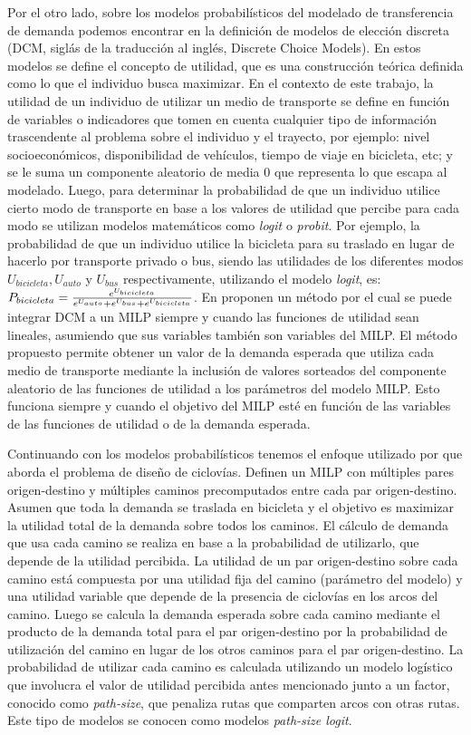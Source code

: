   Por el otro lado, sobre los modelos probabilísticos del modelado de transferencia de demanda podemos encontrar en \textcite{ortuz2011} la definición de modelos de elección discreta (DCM, siglás de la traducción al inglés, Discrete Choice Models). En estos modelos se define el concepto de utilidad, que es una construcción teórica definida como lo que el individuo busca maximizar. En el contexto de este trabajo, la utilidad de un individuo de utilizar un medio de transporte se define en función de variables o indicadores que tomen en cuenta cualquier tipo de información trascendente al problema sobre el individuo y el trayecto, por ejemplo: nivel socioeconómicos, disponibilidad de vehículos, tiempo de viaje en bicicleta, etc; y se le suma un componente aleatorio de media 0 que representa lo que escapa al modelado. Luego, para determinar la probabilidad de que un individuo utilice cierto modo de transporte en base a los valores de utilidad que percibe para cada modo se utilizan modelos matemáticos como {\it logit} o {\it probit}. Por ejemplo, la probabilidad de que un individuo utilice la bicicleta para su traslado en lugar de hacerlo por transporte privado o bus, siendo las utilidades de los diferentes modos $U_{bicicleta}, U_{auto}$ y $U_{bus}$ respectivamente, utilizando el modelo {\it logit}, es: $P_{bicicleta} = {e^{U_{bicicleta}} \over {e^{U_{auto}} + e^{U_{bus}} + e^{U_{bicicleta}}}}$. En \textcite{Pacheco2021} proponen un método por el cual se puede integrar DCM a un MILP siempre y cuando las funciones de utilidad sean lineales, asumiendo que sus variables también son variables del MILP. El método propuesto permite obtener un valor de la demanda esperada que utiliza cada medio de transporte mediante la inclusión de valores sorteados del componente aleatorio de las funciones de utilidad a los parámetros del modelo MILP. Esto funciona siempre y cuando el objetivo del MILP esté en función de las variables de las funciones de utilidad o de la demanda esperada.

  Continuando con los modelos probabilísticos tenemos el enfoque utilizado por \textcite{Liu2019} que aborda el problema de diseño de ciclovías. Definen un MILP con múltiples pares origen-destino y múltiples caminos precomputados entre cada par origen-destino. Asumen que toda la demanda se traslada en bicicleta y el objetivo es maximizar la utilidad total de la demanda sobre todos los caminos. El cálculo de demanda que usa cada camino se realiza en base a la probabilidad de utilizarlo, que depende de la utilidad percibida. La utilidad de un par origen-destino sobre cada camino está compuesta por una utilidad fija del camino (parámetro del modelo) y una utilidad variable que depende de la presencia de ciclovías en los arcos del camino. Luego se calcula la demanda esperada sobre cada camino mediante el producto de la demanda total para el par origen-destino por la probabilidad de utilización del camino en lugar de los otros caminos para el par origen-destino. La probabilidad de utilizar cada camino es calculada utilizando un modelo logístico que involucra el valor de utilidad percibida antes mencionado junto a un factor, conocido como {\it path-size}, que penaliza rutas que comparten arcos con otras rutas. Este tipo de modelos se conocen como modelos {\it path-size logit}.

